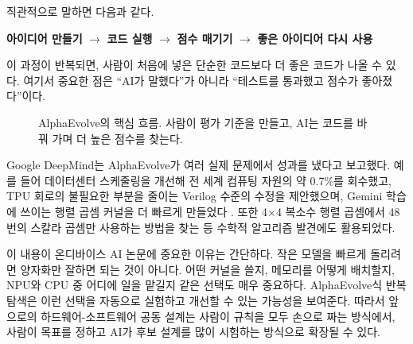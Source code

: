 \documentclass[twocolumn,10pt]{article}
\begin{document}
직관적으로 말하면 다음과 같다.
\begin{center}
\small
\textbf{아이디어 만들기} $\rightarrow$ \textbf{코드 실행} $\rightarrow$ \textbf{점수 매기기} $\rightarrow$ \textbf{좋은 아이디어 다시 사용}
\end{center}
이 과정이 반복되면, 사람이 처음에 넣은 단순한 코드보다 더 좋은 코드가 나올 수 있다. 여기서 중요한 점은 ``AI가 말했다''가 아니라 ``테스트를 통과했고 점수가 좋아졌다''이다.

\begin{figure}[H]
\centering
{}
\caption{AlphaEvolve의 핵심 흐름. 사람이 평가 기준을 만들고, AI는 코드를 바꿔 가며 더 높은 점수를 찾는다.}
\label{fig:ko_alphaevolve}
\end{figure}

Google DeepMind는 AlphaEvolve가 여러 실제 문제에서 성과를 냈다고 보고했다. 예를 들어 데이터센터 스케줄링을 개선해 전 세계 컴퓨팅 자원의 약 0.7\%를 회수했고, TPU 회로의 불필요한 부분을 줄이는 Verilog 수준의 수정을 제안했으며, Gemini 학습에 쓰이는 행렬 곱셈 커널을 더 빠르게 만들었다 \cite{deepmind_alphaevolve_2025}. 또한 4$\times$4 복소수 행렬 곱셈에서 48번의 스칼라 곱셈만 사용하는 방법을 찾는 등 수학적 알고리즘 발견에도 활용되었다.

이 내용이 온디바이스 AI 논문에 중요한 이유는 간단하다. 작은 모델을 빠르게 돌리려면 양자화만 잘하면 되는 것이 아니다. 어떤 커널을 쓸지, 메모리를 어떻게 배치할지, NPU와 CPU 중 어디에 일을 맡길지 같은 선택도 매우 중요하다. AlphaEvolve식 반복 탐색은 이런 선택을 자동으로 실험하고 개선할 수 있는 가능성을 보여준다. 따라서 앞으로의 하드웨어-소프트웨어 공동 설계는 사람이 규칙을 모두 손으로 짜는 방식에서, 사람이 목표를 정하고 AI가 후보 설계를 많이 시험하는 방식으로 확장될 수 있다.
\end{document}

